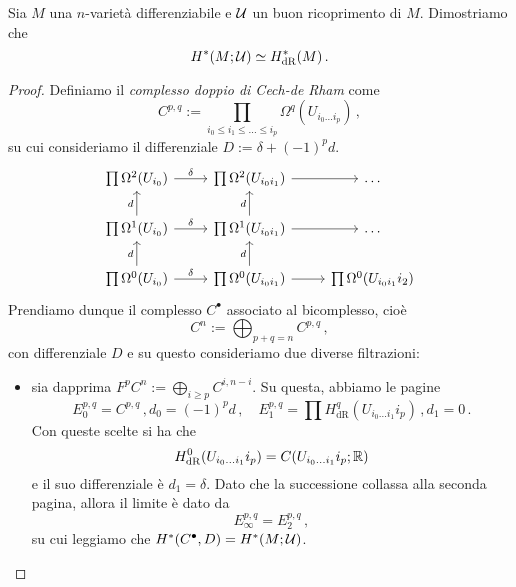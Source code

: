 \begin{ex}
		Sia $M$ una $n$-varietà differenziabile e $\mathcal{U}$ un buon ricoprimento di $M$.
		Dimostriamo che 
		\begin{equation*}
			H^{*}(M;\mathcal{U}) \simeq H^{*}_{\mathrm{dR}}(M)\,.
		\end{equation*} 
		\begin{proof}
			Definiamo il \emph{complesso doppio di Cech-de Rham} come
			\begin{equation*}
				C^{p,q} := \prod_{i_{0} \le i_{1} \le \dots \le i_{p}} \Omega^{q}(U_{i_{0} \dots i_{p}})\,,
			\end{equation*}
			su cui consideriamo il differenziale $D := \delta + (-1)^{p}d$.
			\begin{equation*}
				\begin{tikzcd}
					\prod \Omega^{2}(U_{i_{0}}) \ar[r, "\delta"] 
					& \prod \Omega^{2}(U_{i_{0} i_{1}})  \ar[r] & \dots \\
					\prod \Omega^{1}(U_{i_{0}}) \ar[r, "\delta"] \ar[u, "d"] 
					& \prod \Omega^{1}(U_{i_{0} i_{1}})  \ar[u, "d"] \ar[r] & \dots  \\
					\prod \Omega^{0}(U_{i_{0}}) \ar[r, "\delta"] \ar[u, "d"] 
					& \prod \Omega^{0}(U_{i_{0} i_{1}})  \ar[u, "d"] \ar[r] & 
					\prod \Omega^{0}(U_{i_{0} i_{1}} i_{2})  
				\end{tikzcd}
			\end{equation*}
			Prendiamo dunque il complesso $C^{\bullet}$ associato al bicomplesso,
			cioè
			\begin{equation*}
				C^{n} := \bigoplus_{p+q=n} C^{p,q}\,,
			\end{equation*}
			con differenziale $D$ e su questo consideriamo due
			diverse filtrazioni:
			\begin{itemize}
				\item sia dapprima $F^{p}C^{n} := \bigoplus_{i \ge p} C^{i,n-i}$.
				Su questa, abbiamo le pagine
				\begin{equation*}
					E_{0}^{p,q} = C^{p,q}\,, d_{0} = (-1)^{p}d\,,
					\quad E_{1}^{p,q} = \prod H_{\mathrm{dR}}^{q}(U_{i_{0} \dots i_{1}} i_{p})\,, d_{1} = 0\,.
				\end{equation*}
				Con queste scelte si ha che
				\begin{equation*}
					H^{0}_{\mathrm{dR}}(U_{i_{0} \dots i_{1}} i_{p}) = C(U_{i_{0} \dots i_{1}} i_{p};{\mathbb R})
				\end{equation*}
				e il suo differenziale è $d_{1}=\delta$. Dato che la successione
				collassa alla seconda pagina, allora il limite è dato da
				\begin{equation*}
					E_{\infty}^{p,q} = E_{2}^{p,q}\,,
				\end{equation*}
				su cui leggiamo che $H^{*}(C^{\bullet},D) = H^{*}(M;\mathcal{U})$.
				

\end{itemize}
\end{proof}
\end{ex}
